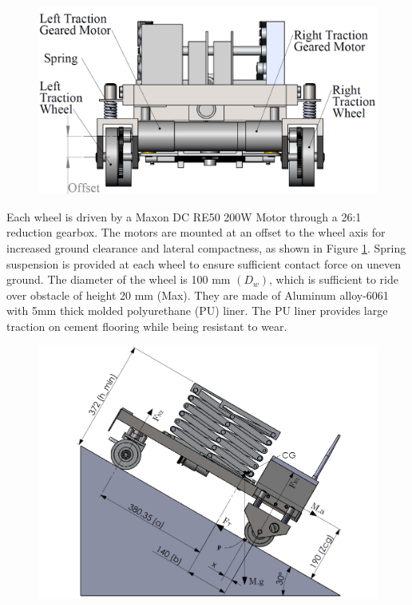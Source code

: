  \begin{figure}[h]
	\centering
	\includegraphics[width=.7\linewidth,keepaspectratio]{Chapter3/fig/WheelOffset}
	\label{fig:tractionDrive}
\end{figure}

    Each wheel is driven by a  Maxon DC RE50 200W Motor through a 26:1 reduction gearbox. The motors are mounted at an offset to the wheel axis for increased ground clearance and lateral compactness, as shown in Figure \ref{fig:tractionDrive}. Spring suspension is provided at each wheel to ensure sufficient contact force on uneven  ground. The diameter of the wheel is 100 mm $(D_w)$, which is sufficient to ride over obstacle of height 20 mm (Max). They are made of Aluminum alloy-6061 with 5mm thick molded polyurethane (PU) liner. The PU liner provides large traction on cement flooring while being resistant to wear.
    
   \begin{figure}[h]
   	\centering
   	\includegraphics[width=0.85\linewidth,keepaspectratio]{Chapter3/fig/loadDist}
   	\label{fig:loadDistribution}
   \end{figure}
